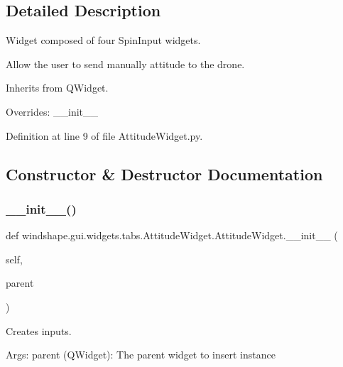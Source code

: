 \subsection{Detailed Description}
\begin{DoxyVerb}Widget composed of four SpinInput widgets.

Allow the user to send manually attitude to the drone.

Inherits from QWidget.

Overrides: __init__
\end{DoxyVerb}
 

Definition at line 9 of file Attitude\+Widget.\+py.



\subsection{Constructor \& Destructor Documentation}
\mbox{\label{classwindshape_1_1gui_1_1widgets_1_1tabs_1_1_attitude_widget_1_1_attitude_widget_a32fc63cd4831a3fec5e1423dc8588577}} 
\subsubsection{\texorpdfstring{\+\_\+\+\_\+init\+\_\+\+\_\+()}{\_\_init\_\_()}}
{\footnotesize\ttfamily def windshape.\+gui.\+widgets.\+tabs.\+Attitude\+Widget.\+Attitude\+Widget.\+\_\+\+\_\+init\+\_\+\+\_\+ (\begin{DoxyParamCaption}\item[{}]{self,  }\item[{}]{parent }\end{DoxyParamCaption})}

\begin{DoxyVerb}Creates inputs.

Args:
    parent (QWidget): The parent widget to insert instance
\end{DoxyVerb}
 

